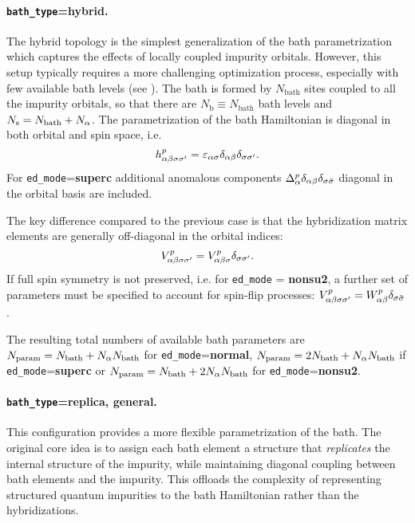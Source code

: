 \documentclass[edipack_sp.tex]{subfiles}
\begin{document}
\paragraph{{\tt bath\_type}={\bf hybrid}.}
The hybrid topology is the simplest generalization of the bath pa\-ra\-me\-tri\-za\-tion which captures the effects of locally
coupled impurity orbitals. However, this setup typically requires a more challenging optimization process, especially
with few available bath levels (see ). 
The bath is formed by $N_\mathrm{bath}$ sites coupled to all the
impurity orbitals, so that there are $N_\mathrm{b}\equiv  N_\mathrm{bath}$ bath levels and   $N_\mathrm{s}=N_\mathrm{bath}+N_\alpha$. 
The parametrization of the bath Hamiltonian is 
diagonal in both orbital and spin space, i.e.
$$
h^p_{\alpha\beta\sigma\sigma'}=\varepsilon_{\alpha\sigma}\delta_{\alpha\beta}\delta_{\sigma\sigma'}.
$$
For {\tt ed\_mode}={\bf superc} additional anomalous components 
$\Delta_\alpha^p\delta_{\alpha\beta}\delta_{\sigma\bar{\sigma}}$ diagonal in the orbital basis are included.
%

The key difference compared to the previous case is that the hybridization matrix elements are generally off-diagonal in the orbital indices:
$$
V^p_{\alpha\beta\sigma\sigma'}=V^p_{\alpha\beta\sigma}\delta_{\sigma\sigma'}.
$$
%
If full spin symmetry is not preserved, i.e. for {\tt ed\_mode} = {\bf nonsu2}, a further 
set of parameters must be specified to account for spin-flip processes:
$V^p_{\alpha\beta\sigma\sigma'} = W^p_{\alpha\beta}\delta_{\sigma \bar{\sigma}}$. 
%

The resulting total numbers of available bath parameters are 
 $N_\mathrm{param}=N_\mathrm{bath}+ N_\alpha N_\mathrm{bath}$ for {\tt ed\_mode}={\bf normal},  
 $N_\mathrm{param}=2N_\mathrm{bath}+ N_\alpha N_\mathrm{bath}$ if  {\tt ed\_mode}={\bf superc} or 
$N_\mathrm{param}=N_\mathrm{bath}+ 2N_\alpha N_\mathrm{bath}$ for  {\tt ed\_mode}={\bf nonsu2}.



\paragraph{{\tt bath\_type}={\bf replica}, {\bf general}.}
This configuration provides a more flexible parametrization of the 
bath. The original core idea \cite{Capone2004PRB,Civelli2006,Koch2008PRB}
is to assign each bath element a structure 
that {\it replicates} the internal structure of the impurity, while 
maintaining diagonal coupling between bath elements and the impurity. 
This offloads the complexity of representing structured quantum 
impurities to the bath Hamiltonian rather than the hybridizations.
\end{document}
